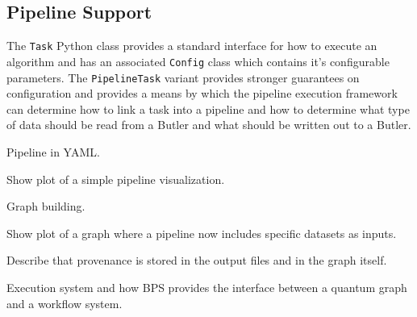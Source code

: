 \subsection{Pipeline Support}

The \texttt{Task} Python class provides a standard interface for how to execute an algorithm and has an associated \texttt{Config} class which contains it's configurable parameters.
The \texttt{PipelineTask} variant provides stronger guarantees on configuration and provides a means by which the pipeline execution framework can determine how to link a task into a pipeline and how to determine what type of data should be read from a Butler and what should be written out to a Butler.

Pipeline in YAML.

Show plot of a simple pipeline visualization.

Graph building.

Show plot of a graph where a pipeline now includes specific datasets as inputs.

Describe that provenance is stored in the output files and in the graph itself.

Execution system and how BPS provides the interface between a quantum graph and a workflow system.
